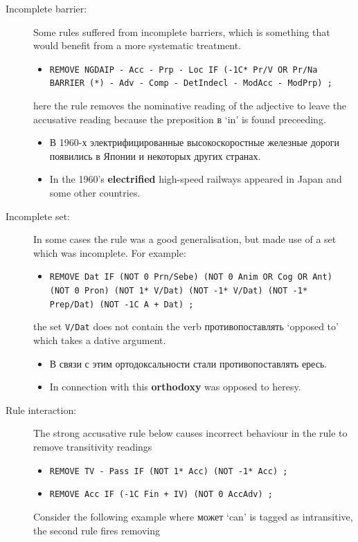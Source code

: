 \documentclass[11pt]{article}
\newcommand{\rus}[1]{\foreignlanguage{russian}{#1}}
\begin{document}
\begin{description}
  \item[ Incomplete barrier:]  Some rules suffered from incomplete barriers, which is something that would
     benefit from a more systematic treatment.
   \begin{itemize} 
     \item \texttt{REMOVE NGDAIP - Acc - Prp - Loc IF (-1C* Pr/V OR Pr/Na BARRIER (*) - Adv - Comp - DetIndecl - ModAcc - ModPrp) ;}
   \end{itemize}
   here the rule removes the nominative reading of the adjective to leave the accusative reading because the preposition \rus{в} `in'
   is found preceeding. 
   \begin{itemize}
     \item \rus{В 1960-х электрифицированные высокоскоростные железные дороги появились в Японии и некоторых других странах.}
     \item In the 1960's \textbf{electrified} high-speed railways appeared in Japan and some other countries.
   \end{itemize} 
  \item[ Incomplete set:] In some cases the rule was a good generalisation, but made use of a set
    which was incomplete. For example:
   \begin{itemize}
     \item \texttt{REMOVE Dat IF (NOT 0 Prn/Sebe) (NOT 0 Anim OR Cog OR Ant) (NOT 0 Pron) (NOT 1* V/Dat) (NOT -1* V/Dat) (NOT -1* Prep/Dat) (NOT -1C A + Dat) ;}
   \end{itemize} 
   the set \texttt{V/Dat} does not contain the verb \rus{противопоставлять} `opposed to' which takes 
   a dative argument.
   \begin{itemize}
     \item \rus{В связи с этим ортодоксальности стали противопоставлять ересь.}
     \item In connection with this \textbf{orthodoxy} was opposed to heresy. 
   \end{itemize}
  \item[ Rule interaction:] The strong accusative rule below causes incorrect behaviour in the rule to remove transitivity readings
  \begin{itemize}
     \item \texttt{REMOVE TV - Pass IF (NOT 1* Acc) (NOT -1* Acc) ;}
     \item \texttt{REMOVE Acc IF (-1C Fin + IV) (NOT 0 AccAdv) ;}
  \end{itemize}
  Consider the following example where \rus{может} `can' is tagged as intransitive, the second rule fires removing 

\end{description}
\end{document}
